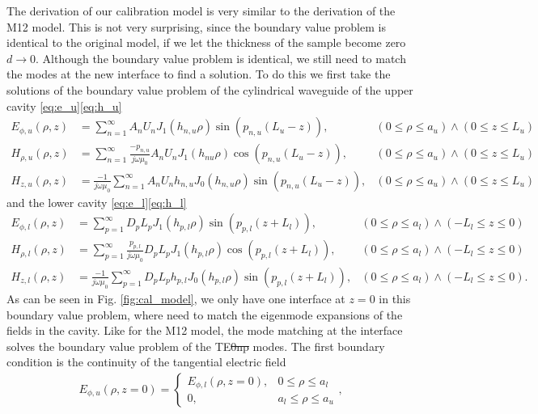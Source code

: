 The derivation of our calibration model is very similar to the derivation of the M12 model. This is not very surprising, since the boundary value problem is identical to the original model, if we let the thickness of the sample become zero $d\rightarrow 0$. Although the boundary value problem is identical, we still need to match the modes at the new interface to find a solution. To do this we first take the solutions of the boundary value problem of the cylindrical waveguide of the upper cavity \eqref{eq:e_u}\eqref{eq:h_u}
\begin{align}
E_{\phi,u}(\rho,z)&=\sum\limits_{n=1}^{\infty} A_nU_nJ_1(h_{n,u}\rho)\sin(p_{n,u}\left(L_u-z\right)), &\scriptstyle (0\leq\rho\leq a_u)\wedge\left(0\leq z\leq L_u\right)\label{eq:e_uc}\\
H_{\rho,u}(\rho,z)&=\sum\limits_{n=1}^{\infty}\frac{-p_{n,u}}{j\omega\mu_0}A_nU_nJ_1(h_{nu}\rho)\cos(p_{n,u}\left(L_u-z\right)),&\scriptstyle\left(0\leq\rho\leq  a_u\right)\wedge\left(0\leq z\leq L_u\right)\label{eq:h_uc}\\
H_{z,u}(\rho,z)&=\frac{-1}{j\omega\mu_0}\sum\limits_{n=1}^\infty A_nU_nh_{n,u}J_0(h_{n,u}\rho)\sin(p_{n,u}\left(L_u-z\right)),&\scriptstyle(0\leq\rho\leq a_u)\wedge\left(0\leq z\leq L_u\right)
\end{align}
and the lower cavity \eqref{eq:e_l}\eqref{eq:h_l}
\begin{align}
E_{\phi,l}(\rho,z)&=\sum\limits_{p=1}^{\infty} D_pL_pJ_1(h_{p,l}\rho)\sin(p_{p,l}\left(z+L_l\right)), & \scriptstyle(0\leq\rho\leq a_l)\wedge\left(-L_l\leq z\leq 0\right)\label{eq:e_lc}\\
H_{\rho,l}(\rho,z)&=\sum\limits_{p=1}^{\infty}\frac{p_{p,l}}{j\omega\mu_0}D_pL_pJ_1(h_{p,l}\rho)\cos(p_{p,l}\left(z+L_l\right)), &\scriptstyle(0\leq\rho\leq a_l)\wedge\left(-L_l\leq z\leq 0\right)\label{eq:h_lc}\\
H_{z,l}(\rho,z)&=\frac{-1}{j\omega\mu_0}\sum\limits_{p=1}^\infty D_pL_ph_{p,l}J_0(h_{p,l}\rho)\sin(p_{p,l}\left(z+L_l\right)), &\scriptstyle(0\leq\rho\leq a_l)\wedge\left(-L_l\leq z\leq 0\right)\text{.}
\end{align}
As can be seen in Fig. \ref{fig:cal_model}, we only have one interface at $z=0$ in this boundary value problem, where need to match the eigenmode expansions of the fields in the cavity. Like for the M12 model, the mode matching at the interface solves the boundary value problem of the TE\st{0np} modes. The first boundary condition is the continuity of the tangential electric field
\begin{align}\label{eq:bcc_1}
E_{\phi,u}\left(\rho,z=0\right)= \begin{cases}
    E_{\phi,l}(\rho,z=0) , & 0\leq\rho\leq a_l\\
    0, & a_l\leq\rho\leq a_u
  \end{cases}\text{,}
\end{align}

